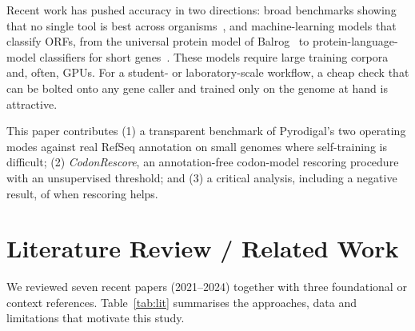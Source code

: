 Recent work has pushed accuracy in two directions: broad benchmarks showing that no single tool is best across organisms~\cite{dimonaco2022}, and machine-learning models that classify ORFs, from the universal protein model of Balrog~\cite{sommer2021} to protein-language-model classifiers for short genes~\cite{tu2023}. These models require large training corpora and, often, GPUs. For a student- or laboratory-scale workflow, a cheap check that can be bolted onto any gene caller and trained only on the genome at hand is attractive.

This paper contributes (1) a transparent benchmark of Pyrodigal's two operating modes against real RefSeq annotation on small genomes where self-training is difficult; (2) \emph{CodonRescore}, an annotation-free codon-model rescoring procedure with an unsupervised threshold; and (3) a critical analysis, including a negative result, of when rescoring helps.

\section{Literature Review / Related Work}
We reviewed seven recent papers (2021--2024) together with three foundational or context references. Table~\ref{tab:lit} summarises the approaches, data and limitations that motivate this study.

